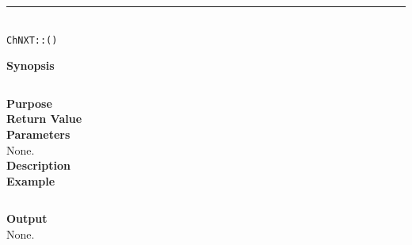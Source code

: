 \noindent
\vspace{5pt}
\rule{4.5in}{0.015in}\\
\noindent
{\LARGE \texttt{ChNXT::()} }\\


\noindent
{\bf Synopsis}
\vspace{-8pt}
\begin{verbatim}
\end{verbatim}

\noindent
{\bf Purpose}\\

\noindent
{\bf Return Value}\\

\noindent
{\bf Parameters}\\
None.\\

\noindent
{\bf Description}\\

\noindent
{\bf Example}
\begin{verbatim}
\end{verbatim}

\noindent
{\bf Output}\\
None.\\
\\
